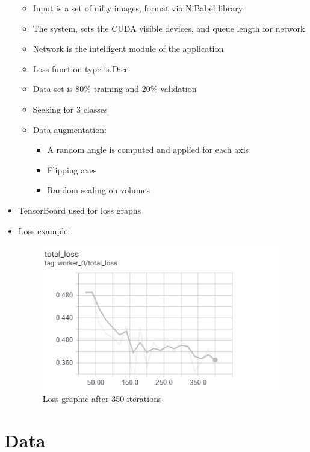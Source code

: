 \documentclass[runningheads,a4paper,11pt]{report}
\begin{document}
\begin{itemize}
    \begin{itemize}
        \item Input is a set of nifty images, format via NiBabel library
        \item The system, sets the CUDA visible devices, and queue length for network
        \item Network is the intelligent module of the application
        \item Loss function type is Dice
        \item Data-set is 80\% training and 20\% validation
        \item Seeking for 3 classes 
        \item Data augmentation:
        \begin{itemize}
            \item A random angle is computed and applied for each axis
            \item Flipping axes
            \item Random scaling on volumes
        \end{itemize}
    \end{itemize}
    \item TensorBoard used for loss graphs
    \item Loss example:
    

    \begin{figure}[htbp]
	    \centerline{\includegraphics{Images/Loss.png}}  
	    \caption{Loss graphic after 350 iterations}
	\label{loss350}
    \end{figure}

\end{itemize}

\section{Data}
\label{section:data}
\end{document}

